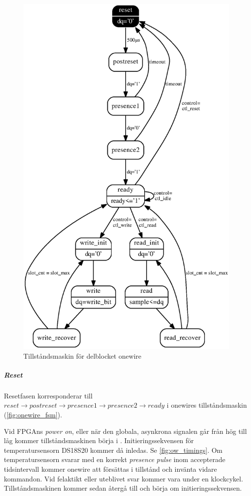 \documentclass[a4paper]{scrreprt}
\begin{document}
\begin{figure}[H]
\centering
\includegraphics[height=0.97\textheight]{onewire_fsm.eps}
\caption{Tillståndsmaskin för delblocket onewire}
\label{fig:onewire_fsm}
\end{figure}


\subparagraph{Reset}
Resetfasen korresponderar till $reset\rightarrow postreset\rightarrow presence1\rightarrow presence2\rightarrow ready$ i onewires tillståndsmaskin (\autoref{fig:onewire_fsm}).

Vid FPGAns \emph{power on}, eller när den globala, asynkrona  signalen går från hög till låg kommer tillståndsmaskinen börja i . Initieringssekvensen för temperatursensorn DS18S20 kommer då inledas. Se \autoref{fig:ow_timings}. Om temperatursensorn svarar med en korrekt \emph{presence pulse} inom accepterade tidsintervall kommer onewire att försättas i tillstånd  och invänta vidare kommandon. Vid felaktikt eller uteblivet svar kommer  vara \high{} under en klockcykel. Tillståndsmaskinen kommer sedan återgå till  och börja om initieringssekvensen.
\end{document}
